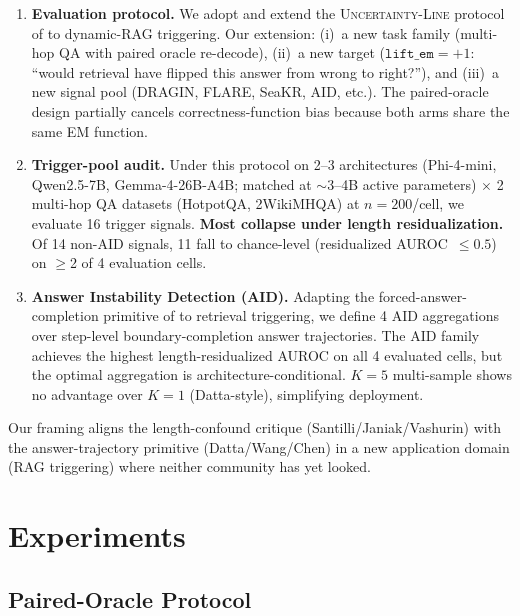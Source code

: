 \documentclass[11pt]{article}
\begin{document}
\begin{enumerate}
\item \textbf{Evaluation protocol.} We adopt and extend the
\textsc{Uncertainty-Line} protocol of
\cite{Vashurin_UncertaintyLineLengthInvariant} to dynamic-RAG
triggering. Our extension: (i)~a new task family (multi-hop QA with
paired oracle re-decode), (ii)~a new target
($\texttt{lift\_em} = +1$: ``would retrieval have flipped this
answer from wrong to right?''), and (iii)~a new signal pool
(DRAGIN, FLARE, SeaKR, AID, etc.). The paired-oracle design
partially cancels correctness-function bias
\citep{Ielanskyi_PitfallsUQEvaluationNLG} because both arms share
the same EM function.

\item \textbf{Trigger-pool audit.} Under this protocol on 2--3
architectures (Phi-4-mini, Qwen2.5-7B, Gemma-4-26B-A4B; matched at
$\sim$3--4B active parameters) $\times$ 2 multi-hop QA datasets
(HotpotQA, 2WikiMHQA) at $n{=}200$/cell, we evaluate 16 trigger
signals. \textbf{Most collapse under length residualization.} Of 14
non-AID signals, 11 fall to chance-level (residualized
AUROC~$\leq 0.5$) on $\geq$2 of 4 evaluation cells.

\item \textbf{Answer Instability Detection (AID).} Adapting the
forced-answer-completion primitive of
\cite{Datta_DecideEarlyExplainLater} to retrieval triggering, we
define 4 AID aggregations over step-level boundary-completion
answer trajectories. The AID family achieves the highest
length-residualized AUROC on all 4 evaluated cells, but the
optimal aggregation is architecture-conditional.
$K{=}5$ multi-sample shows no advantage over $K{=}1$
(Datta-style), simplifying deployment.
\end{enumerate}

\noindent Our framing aligns the length-confound critique
(Santilli/Janiak/Vashurin) with the answer-trajectory primitive
(Datta/Wang/Chen) in a new application domain (RAG triggering)
where neither community has yet looked.


\section{Experiments}

\subsection{Paired-Oracle Protocol}
\end{document}

